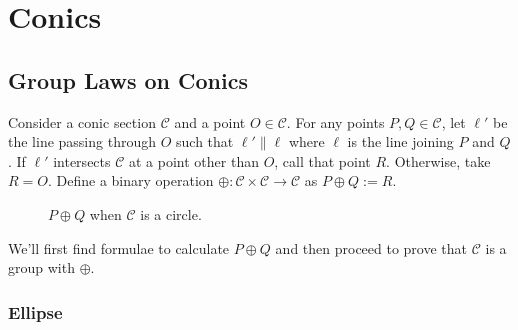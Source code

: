 \chapter{Conics}

\section{Group Laws on Conics}

Consider a conic section $\mathcal{C}$ and a point $O \in \mathcal{C}$. For any points $P,Q \in \mathcal{C}$,
let $\ell'$ be the line passing through $O$ such that $\ell' \parallel \ell$ where
$\ell$ is the line joining $P$ and $Q$. If $\ell'$ intersects $\mathcal{C}$ at a point
other than $O$, call that point $R$. Otherwise, take $R=O$. Define a binary
operation $\oplus : \mathcal{C} \times \mathcal{C} \to \mathcal{C}$ as $P \oplus Q := R$.
\vspace{1ex}

\begin{figure}[H]
    \center

    \caption{$P \oplus Q$ when $\mathcal{C}$ is a circle.}
\end{figure}

We'll first find formulae to calculate $P \oplus Q$ and then proceed to prove
that $\mathcal{C}$ is a group with $\oplus$.

\subsection*{Ellipse}

